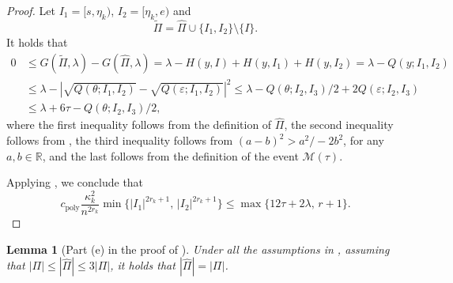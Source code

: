 \documentclass{article}
\newtheorem{lemma}[theorem]{Lemma}
\begin{document}
\begin{proof}
Let $I_1 = [s, \eta_k)$, $I_2 = [\eta_k, e)$ and
	\[
		\widetilde{\Pi} = \widehat{\Pi} \cup \{I_1, I_2\} \setminus \{I\}.
	\]
	It holds that
	\begin{align*}
		0 & \leq G(\widetilde{\Pi}, \lambda) - G(\widehat{\Pi}, \lambda) = \lambda - H(y, I) + H(y, I_1) + H(y, I_2) = \lambda - Q(y;I_1,I_2) \\
		& \leq \lambda - |\sqrt{Q(\theta; I_1, I_2)} - \sqrt{Q(\varepsilon; I_1, I_2)}|^2 \leq \lambda - Q(\theta; I_2, I_3)/2 + 2 Q(\varepsilon; I_2, I_3) \\
		& \leq \lambda + 6\tau - Q(\theta; I_2, I_3)/2,
	\end{align*}
	where the first inequality follows from the definition of $\widehat{\Pi}$, the second inequality follows from , the third inequality follows from $(a-b)^2 > a^2/ - 2b^2$, for any $a, b \in \mathbb{R}$, and the last follows from the definition of the event $\mathcal{M}(\tau)$.

Applying , we conclude that 
	\[
		c_{\mathrm{poly}} \frac{\kappa_k^2}{n^{2r_k}} \min\{|I_1|^{2r_k + 1}, \, |I_2|^{2r_k + 1}\}\leq \max\{12\tau + 2\lambda, \, r + 1\}.
	\]
\end{proof}


\begin{lemma}[Part (e) in the proof of ]\label{sec-proof-e}
Under all the assumptions in , assuming that $|\Pi| \leq |\widehat{\Pi}| \leq 3 |\Pi|$, it holds that $|\widehat{\Pi}| = |\Pi|$.
\end{lemma}
\end{document}
